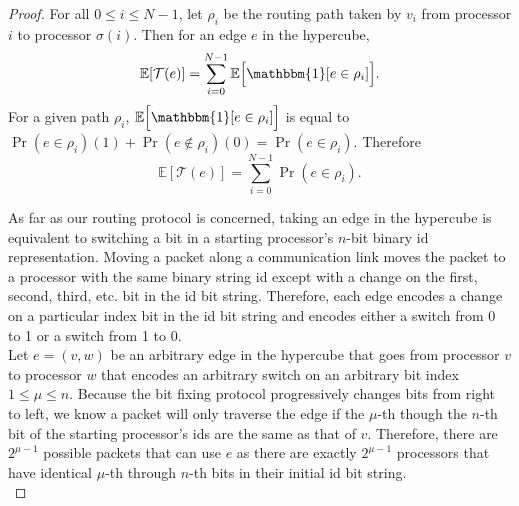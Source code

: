 \documentclass[psamsfonts, 10pt]{amsart}
\theoremstyle{definition}
\theoremstyle{remark}
\numberwithin{equation}{section}
\newcommand{\E}{\mathbb{E}}
\newcommand{\indicator}{\mathbbm{1}}
\begin{document}
\begin{proof}
For all $0 \leq i \leq N-1$, let $\rho_i$ be the routing path taken by $v_i$ from processor $i$ to processor $\sigma(i)$. Then for an edge $e$ in the hypercube,
\[
\E[\mathcal{T}(e)] = \sum_{i = 0}^{N-1} \E\Big[\indicator[e \in \rho_i]\Big].
\]
For a given path $\rho_i$, $\E\Big[\indicator[e \in \rho_i] \Big]$ is equal to $\Pr(e \in \rho_i)(1) + \Pr(e \notin \rho_i)(0) = \Pr(e \in \rho_i)$. Therefore
\begin{equation*}
 \E[\mathcal{T}(e)] = \sum_{i = 0}^{N-1} \Pr(e \in \rho_i).
 \end{equation*}

As far as our routing protocol is concerned, taking an edge in the hypercube is equivalent to switching a bit in a starting processor's $n$-bit binary id representation. Moving a packet along a communication link moves the packet to a processor with the same binary string id except with a change on the first, second, third, etc. bit in the id bit string. Therefore, each edge encodes a change on a particular index bit in the id bit string and encodes either a switch from 0 to 1 or a switch from 1 to 0.\\

Let $e = (v,w)$ be an arbitrary edge in the hypercube that goes from processor $v$ to processor $w$ that encodes an arbitrary switch on an arbitrary bit index $1 \leq \mu \leq n$. Because the bit fixing protocol progressively changes bits from right to left, we know a packet will only traverse the edge if the $\mu$-th though the $n$-th bit of the starting processor's ids are the same as that of $v$. Therefore, there are $2^{\mu-1}$ possible packets that can use $e$ as there are exactly $2^{\mu-1}$ processors that have identical $\mu$-th through $n$-th bits in their initial id bit string.\\


\end{proof}
\end{document}
